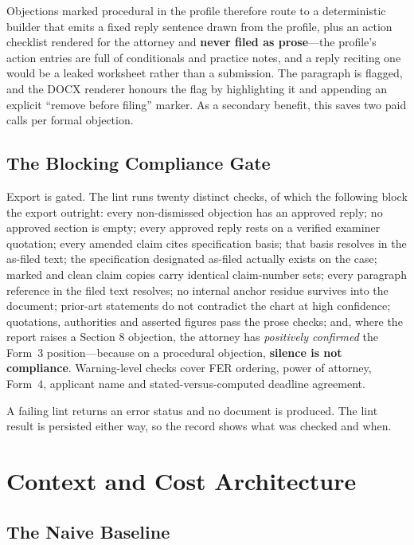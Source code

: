 \documentclass[conference]{IEEEtran}
\begin{document}
Objections marked procedural in the profile therefore route to a deterministic builder that emits a fixed reply sentence drawn from the profile, plus an action checklist rendered for the attorney and \textbf{never filed as prose}---the profile's action entries are full of conditionals and practice notes, and a reply reciting one would be a leaked worksheet rather than a submission. The paragraph is flagged, and the DOCX renderer honours the flag by highlighting it and appending an explicit ``remove before filing'' marker. As a secondary benefit, this saves two paid calls per formal objection.

\subsection{The Blocking Compliance Gate}

Export is gated. The lint runs twenty distinct checks, of which the following block the export outright: every non-dismissed objection has an approved reply; no approved section is empty; every approved reply rests on a verified examiner quotation; every amended claim cites specification basis; that basis resolves in the as-filed text; the specification designated as-filed actually exists on the case; marked and clean claim copies carry identical claim-number sets; every paragraph reference in the filed text resolves; no internal anchor residue survives into the document; prior-art statements do not contradict the chart at high confidence; quotations, authorities and asserted figures pass the prose checks; and, where the report raises a Section 8 objection, the attorney has \emph{positively confirmed} the Form~3 position---because on a procedural objection, \textbf{silence is not compliance}. Warning-level checks cover FER ordering, power of attorney, Form~4, applicant name and stated-versus-computed deadline agreement.

A failing lint returns an error status and no document is produced. The lint result is persisted either way, so the record shows what was checked and when.

\section{Context and Cost Architecture}
\label{sec:cost}

\subsection{The Naive Baseline}
\end{document}

